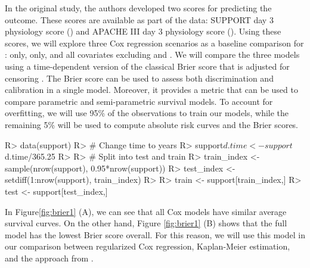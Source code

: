 \documentclass[
]{jss}
\begin{document}
In the original study, the authors developed two scores for predicting
the outcome. These scores are available as part of the data: SUPPORT day
3 physiology score () and APACHE III day 3 physiology score
(). Using these scores, we will explore three Cox regression
scenarios as a baseline comparison for :  only,
 only, and all covariates excluding  and .
We will compare the three models using a time-dependent version of the
classical Brier score that is adjusted for censoring
\citep{graf1999ass}. The Brier score can be used to assess both
discrimination and calibration in a single model. Moreover, it provides
a metric that can be used to compare parametric and semi-parametric
survival models. To account for overfitting, we will use 95\% of the
observations to train our models, while the remaining 5\% will be used
to compute absolute risk curves and the Brier scores.

\begin{CodeChunk}

\begin{CodeInput}
R> data(support)
R> # Change time to years
R> support$d.time <- support$d.time/365.25
R> 
R> # Split into test and train
R> train_index <- sample(nrow(support), 0.95*nrow(support))
R> test_index <- setdiff(1:nrow(support), train_index)
R> 
R> train <- support[train_index,]
R> test <- support[test_index,]
\end{CodeInput}
\end{CodeChunk}

In Figure\ref{fig:brier1} (A), we can see that all Cox models have
similar average survival curves. On the other hand, Figure
\ref{fig:brier1} (B) shows that the full model has the lowest Brier
score overall. For this reason, we will use this model in our comparison
between regularized Cox regression, Kaplan-Meier estimation, and the
approach from .
\end{document}
